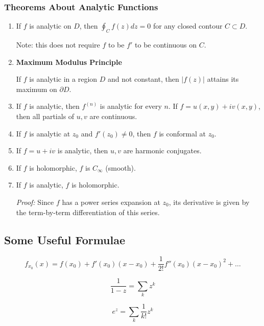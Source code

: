 \documentclass{article}
\begin{document}
\subsubsection{Theorems About Analytic Functions}
\begin{enumerate}

    \item If $f$ is analytic on $D$, then $\oint_C f(z) dz = 0$ for any closed contour $C \subset D$.
    
    Note: this does not require $f$ to be $f'$ to be continuous on $C$.
  
   \item \textbf{Maximum Modulus Principle}
   
   If $f$ is analytic in a region $D$ and not constant, then $|f(z)|$ attains its maximum on $\partial D$.
   
   \item If $f$ is analytic, then $f^{(n)}$ is analytic for every $n$. If $f = u(x,y) + iv(x,y)$, then all partials of $u,v$ are continuous.
   
   \item If $f$ is analytic at $z_0$ and $f'(z_0) \neq 0$, then $f$ is conformal at $z_0$.
   
   \item If $f = u+iv$ is analytic, then $u,v$ are harmonic conjugates.
   
   \item If $f$ is holomorphic, $f$ is $C_\infty$ (smooth).
   
   \item If $f$ is analytic, $f$ is holomorphic.
   
   \textit{Proof:} Since $f$ has a power series expansion at $z_0$, its derivative is given by the term-by-term differentiation of this series.
   
\end{enumerate}


\subsection{Some Useful Formulae}

\[
f_{x_0}(x) = f(x_0) + f'(x_0)(x-x_0) + \frac{1}{2!}f''(x_0)(x-x_0)^2 + \ldots
\]

\[ 
\frac{1}{1-z} = \sum_k z^k
\]

\[ 
e^z = \sum_k \frac{1}{k!} z^k 
\]
\end{document}
